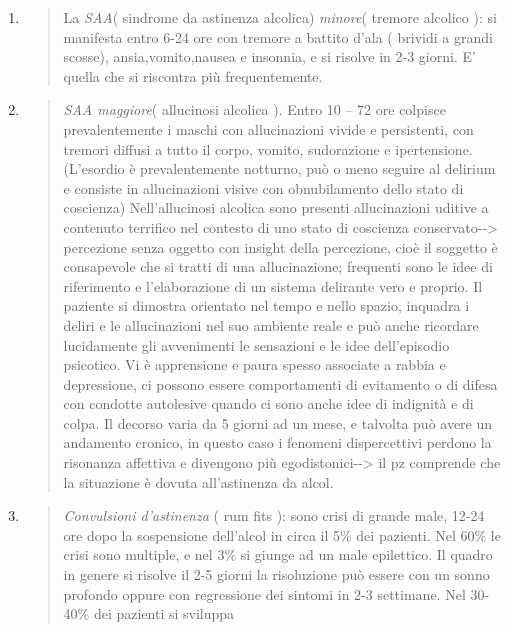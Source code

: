 \documentclass[]{article}
\begin{document}
\begin{enumerate}
\def\labelenumi{\arabic{enumi})}
\item
  \begin{quote}
  La \emph{SAA}( sindrome da astinenza alcolica) \emph{minore}( tremore
  alcolico ): si manifesta entro 6-24 ore con tremore a battito d'ala (
  brividi a grandi scosse), ansia,vomito,nausea e insonnia, e si risolve
  in 2-3 giorni. E' quella che si riscontra più frequentemente.
  \end{quote}
\item
  \begin{quote}
  \emph{SAA maggiore}( allucinosi alcolica ). Entro 10 -- 72 ore
  colpisce prevalentemente i maschi con allucinazioni vivide e
  persistenti, con tremori diffusi a tutto il corpo, vomito, sudorazione
  e ipertensione. (L'esordio è prevalentemente notturno, può o meno
  seguire al delirium e consiste in allucinazioni visive con
  obnubilamento dello stato di coscienza) Nell'allucinosi alcolica sono
  presenti allucinazioni uditive a contenuto terrifico nel contesto di
  uno stato di coscienza conservato-\/-\textgreater{} percezione senza
  oggetto con insight della percezione, cioè il soggetto è consapevole
  che si tratti di una allucinazione; frequenti sono le idee di
  riferimento e l'elaborazione di un sistema delirante vero e proprio.
  Il paziente si dimostra orientato nel tempo e nello spazio, inquadra i
  deliri e le allucinazioni nel suo ambiente reale e può anche ricordare
  lucidamente gli avvenimenti le sensazioni e le idee dell'episodio
  psicotico. Vi è apprensione e paura spesso associate a rabbia e
  depressione, ci possono essere comportamenti di evitamento o di difesa
  con condotte autolesive quando ci sono anche idee di indignità e di
  colpa. Il decorso varia da 5 giorni ad un mese, e talvolta può avere
  un andamento cronico, in questo caso i fenomeni dispercettivi perdono
  la risonanza affettiva e divengono più egodistonici-\/-\textgreater{}
  il pz comprende che la situazione è dovuta all'astinenza da alcol.
  \end{quote}
\item
  \begin{quote}
  \emph{Convulsioni d'astinenza} ( rum fits ): sono crisi di grande
  male, 12-24 ore dopo la sospensione dell'alcol in circa il 5\% dei
  pazienti. Nel 60\% le crisi sono multiple, e nel 3\% si giunge ad un
  male epilettico. Il quadro in genere si risolve il 2-5 giorni la
  risoluzione può essere con un sonno profondo oppure con regressione
  dei sintomi in 2-3 settimane. Nel 30-40\% dei pazienti si sviluppa

\end{quote}
\end{enumerate}
\end{document}
